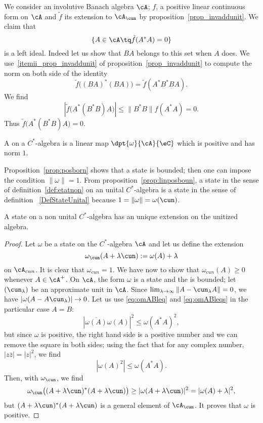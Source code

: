We consider an involutive Banach algebra $\cA$; $f$, a positive linear continuous form on $\cA$ and $\tilde f$ its extension to $\cA_{\cun}$ by proposition~\ref{prop_invaddunit}. We claim that
\[
	\{ A\in\cA\tq \tilde f(A^*A)=0 \}
\]
is a left ideal. Indeed let us show that $BA$ belongs to this set when $A$ does. We use~\ref{itemii_prop_invaddunit} of proposition~\ref{prop_invaddunit} to compute the norm on both side of the identity
\[
	\tilde f\big( (BA)^*(BA) \big)=\tilde f(A^*B^*BA).
\]
We find
\[
	| \tilde f\big( A^*(B^*B)A \big) |\leq \| B^*B \|f(A^*A)=0.
\]
Thus $\tilde f\big( A^*(B^*B)A \big)=0$.


\begin{definition}      \label{DefStateCSA}
	A  on a $C^*$-algebra is a linear map $\dpt{\omega}{\cA}{\eC}$ which is positive and has norm $1$.\label{def:etatnon}
\end{definition}
Proposition~\ref{prop:posborn} shows that a state is bounded; then one can impose the condition $\| \omega \|=1$. From proposition~\ref{prop:linposboun}, a state in the sense of definition~\ref{def:etatnon} on an unital  $C^*$-algebra is a state in the sense of definition ~\ref{DefStateUnital} because $1=\| \omega \|=\omega(\cun)$.

\begin{proposition}
	A state on a non unital $C^*$-algebra has an unique extension on the unitized algebra. \label{prop_st_unit_ext}
\end{proposition}

\begin{proof}
	Let $\omega$ be a state on the $C^*$-algebra $\cA$ and let us define the extension
	\[
		\omega_{\cun}(A+\lambda\cun):=\omega(A)+\lambda
	\]
	on $\cA_{cun}$. It is clear that $\omega_{cun}=1$. We have now to show that $\omega_{cun}(A)\geq 0$ whenever $A\in\cA^+$. On $\cA$, the form $\omega$ is a state and the is bounded; let $(\cun_{\lambda})$ be an approximate unit in $\cA$. Since $\lim_{\lambda\to\infty}\| A-\cun_{\lambda}A \|=0$, we have $| \omega(A-A\cun_{\lambda}) |\to 0$. Let us use \eqref{eq:omABleq} and \eqref{eq:omABleqs} in the particular case $A=B$:
	\[
		| \overline{\omega(A)}\omega(A) |^2\leq\omega(A^*A)^2,
	\]
	but since $\omega$ is positive, the right hand side is a positive number and we can remove the square in both sides; using the fact that for any complex number, $| z\overline{z} |=| z |^2$, we find
	\[
		| \omega(A)^2 |\leq \omega(A^*A).
	\]
	Then, with $\omega_{\cun}$, we find
	\[
		\omega_{\cun}\big( (A+\lambda\cun)^*(A+\lambda\cun) \big)\geq | \omega(A+\lambda\cun) |^2=| \omega(A)+\lambda |^2,
	\]
	but $(A+\lambda\cun)^*(A+\lambda\cun)$ is a general element of $\cA_{\cun}$. It proves that $\omega$ is positive.

\end{proof}


